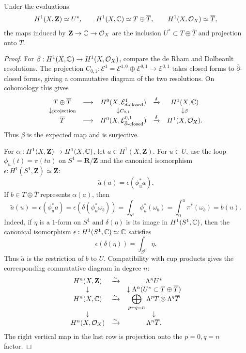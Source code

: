 \begin{proposition}
\label{mumford-frag-comparison}
Under the evaluations
\[
 H^1(X,\mathbf Z)\simeq U^*,\qquad
 H^1(X,\mathbb{C})\simeq T\oplus\overline T,\qquad
 H^1(X,\mathcal O_X)\simeq\overline T,
\]
the maps induced by $\mathbf Z\to\mathbb{C}\to\mathcal O_X$ are the inclusion
$U^*\subset T\oplus\overline T$ and projection onto $\overline T$.
\end{proposition}
\begin{proof}
For $\beta:H^1(X,\mathbb{C})\to H^1(X,\mathcal O_X)$, compare the de Rham and
Dolbeault resolutions.  The projection
$C_{0,1}:\mathcal E^1=\mathcal E^{1,0}\oplus\mathcal E^{0,1}\to\mathcal E^{0,1}$
takes closed forms to $\bar\partial$-closed forms, giving a commutative
diagram of the two resolutions.  On cohomology this gives
\[
\begin{array}{ccccc}
T\oplus\overline T&\longrightarrow&H^0(X,\mathcal E^1_{d\text{-closed}})&\xrightarrow{\delta}&H^1(X,\mathbb{C})\\
\downarrow\scriptstyle{\rm projection}&&\downarrow\scriptstyle{C_{0,1}}&&\downarrow\scriptstyle{\beta}\\
\overline T&\longrightarrow&H^0(X,\mathcal E^{0,1}_{\bar\partial\text{-closed}})&\xrightarrow{\delta}&H^1(X,\mathcal O_X).
\end{array}
\]
Thus $\beta$ is the expected map and is surjective.

For $\alpha:H^1(X,\mathbf Z)\to H^1(X,\mathbb{C})$, let $a\in H^1(X,\mathbf Z)$.
For $u\in U$, use the loop $\phi_u(t)=\pi(tu)$ on $S^1=\mathbf R/\mathbf Z$
and the canonical isomorphism $\epsilon:H^1(S^1,\mathbf Z)\simeq\mathbf Z$:
\[
 \widetilde a(u)=\epsilon(\phi_u^*a).
\]
If $b\in T\oplus\overline T$ represents $\alpha(a)$, then
\[
 \widetilde a(u)=\epsilon(\phi_u^*a)
 =\epsilon(\delta(\phi_u^*\omega_b))
 =\int_{S^1}\phi_u^*(\omega_b)
 =\int_0^u\pi^*(\omega_b)=b(u).
\]
Indeed, if $\eta$ is a $1$-form on $S^1$ and $\delta(\eta)$ is its image in
$H^1(S^1,\mathbb{C})$, then the canonical isomorphism
$\epsilon:H^1(S^1,\mathbb{C})\simeq\mathbb{C}$ satisfies
\[
 \epsilon(\delta(\eta))=\int_{S^1}\eta.
\]
Thus $\widetilde a$ is the restriction of $b$ to $U$.  Compatibility with
cup products gives the corresponding commutative diagram in degree $n$:
\[
\begin{array}{ccccc}
H^n(X,\mathbf Z)&\xrightarrow{\sim}&\Lambda^nU^*\\
\downarrow&&\downarrow\Lambda^n(U^*\subset T\oplus\overline T)\\
H^n(X,\mathbb{C})&\xrightarrow{\sim}&\displaystyle\bigoplus_{p+q=n}\Lambda^pT\otimes\Lambda^q\overline T\\
\downarrow&&\downarrow\\
H^n(X,\mathcal O_X)&\xrightarrow{\sim}&\Lambda^n\overline T.
\end{array}
\]
The right vertical map in the last row is projection onto the $p=0,q=n$
factor.
\end{proof}


